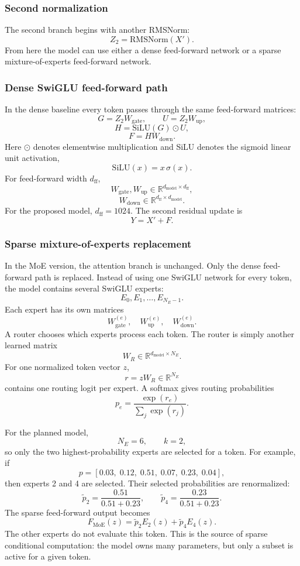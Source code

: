 \documentclass[11pt]{article}
\begin{document}
\subsubsection{Second normalization}
The second branch begins with another RMSNorm:
\[
Z_2=\mathrm{RMSNorm}(X').
\]
From here the model can use either a dense feed-forward network or a sparse
mixture-of-experts feed-forward network.

\subsubsection{Dense SwiGLU feed-forward path}
In the dense baseline every token passes through the same feed-forward matrices:
\[
G=Z_2W_{\mathrm{gate}},
\qquad
U=Z_2W_{\mathrm{up}},
\]
\[
H=\mathrm{SiLU}(G)\odot U,
\]
\[
F=HW_{\mathrm{down}}.
\]
Here $\odot$ denotes elementwise multiplication and SiLU denotes the sigmoid
linear unit activation,
\[
\mathrm{SiLU}(x)=x\,\sigma(x).
\]
For feed-forward width $d_{\mathrm{ff}}$,
\[
W_{\mathrm{gate}},W_{\mathrm{up}}
\in\mathbb{R}^{d_{\mathrm{model}}\times d_{\mathrm{ff}}},
\]
\[
W_{\mathrm{down}}
\in\mathbb{R}^{d_{\mathrm{ff}}\times d_{\mathrm{model}}}.
\]
For the proposed model, $d_{\mathrm{ff}}=1024$.
The second residual update is
\[
Y=X'+F.
\]

\subsubsection{Sparse mixture-of-experts replacement}
In the MoE version, the attention branch is unchanged. Only the dense feed-forward
path is replaced.  Instead of using one SwiGLU network for every token, the model
contains several SwiGLU experts:
\[
E_0,E_1,\ldots,E_{N_E-1}.
\]
Each expert has its own matrices
\[
W_{\mathrm{gate}}^{(e)},\quad
W_{\mathrm{up}}^{(e)},\quad
W_{\mathrm{down}}^{(e)}.
\]
A router chooses which experts process each token.  The router is simply another
learned matrix
\[
W_R\in\mathbb{R}^{d_{\mathrm{model}}\times N_E}.
\]
For one normalized token vector $z$,
\[
r=zW_R\in\mathbb{R}^{N_E}
\]
contains one routing logit per expert.  A softmax gives routing probabilities
\[
p_e=\frac{\exp(r_e)}{\sum_j\exp(r_j)}.
\]

For the planned model,
\[
N_E=6,\qquad k=2,
\]
so only the two highest-probability experts are selected for a token.  For example,
if
\[
p=[0.03,\;0.12,\;0.51,\;0.07,\;0.23,\;0.04],
\]
then experts 2 and 4 are selected. Their selected probabilities are renormalized:
\[
\widetilde p_2=\frac{0.51}{0.51+0.23},
\qquad
\widetilde p_4=\frac{0.23}{0.51+0.23}.
\]
The sparse feed-forward output becomes
\[
F_{\mathrm{MoE}}(z)
=
\widetilde p_2E_2(z)+\widetilde p_4E_4(z).
\]
The other experts do not evaluate this token. This is the source of sparse
conditional computation: the model owns many parameters, but only a subset is
active for a given token.
\end{document}
